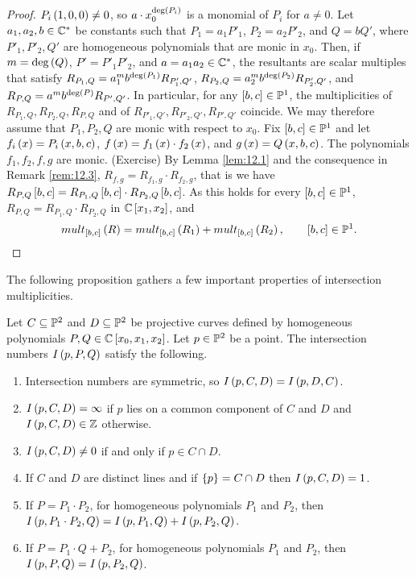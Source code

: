 \begin{proof}
$ P_i\br{1, 0, 0} \ne 0 $, so $ a \cdot x_0^{\deg\br{P_i}} $ is a monomial of $ P_i $ for $ a \ne 0 $. Let $ a_1, a_2, b \in \C^* $ be constants such that $ P_1 = a_1P'_1 $, $ P_2 = a_2P'_2 $, and $ Q = bQ' $, where $ P'_1, P'_2, Q' $ are homogeneous polynomials that are monic in $ x_0 $. Then, if $ m = \deg\br{Q} $, $ P' = P'_1P'_2 $, and $ a = a_1a_2 \in \C^* $, the resultants are scalar multiples that satisfy $ R_{P_1, Q} = a_1^mb^{\deg\br{P_1}}R_{P'_1, Q'} $, $ R_{P_2, Q} = a_2^mb^{\deg\br{P_2}}R_{P'_2, Q'} $, and $ R_{P, Q} = a^mb^{\deg\br{P}}R_{P', Q'} $. In particular, for any $ \sbr{b, c} \in \P^1 $, the multiplicities of $ R_{P_1, Q}, R_{P_2, Q}, R_{P, Q} $ and of $ R_{P'_1, Q'}, R_{P'_2, Q'}, R_{P', Q'} $ coincide. We may therefore assume that $ P_1, P_2, Q $ are monic with respect to $ x_0 $. Fix $ \sbr{b, c} \in \P^1 $ and let $ f_i\br{x} = P_i\br{x, b, c} $, $ f\br{x} = f_1\br{x} \cdot f_2\br{x} $, and $ g\br{x} = Q\br{x, b, c} $. The polynomials $ f_1, f_2, f, g $ are monic. (Exercise) By Lemma \ref{lem:12.1} and the consequence in Remark \ref{rem:12.3}, $ R_{f, g} = R_{f_1, g} \cdot R_{f_2, g} $, that is we have $ R_{P, Q}\sbr{b, c} = R_{P_1, Q}\sbr{b, c} \cdot R_{P_2, Q}\sbr{b, c} $. As this holds for every $ \sbr{b, c} \in \P^1 $, $ R_{P, Q} = R_{P_1, Q} \cdot R_{P_2, Q} $ in $ \C\sbr{x_1, x_2} $, and
$$ mult_{\sbr{b, c}}\br{R} = mult_{\sbr{b, c}}\br{R_1} + mult_{\sbr{b, c}}\br{R_2}, \qquad \sbr{b, c} \in \P^1. $$
\end{proof}

\pagebreak

The following proposition gathers a few important properties of intersection multiplicities.

\begin{proposition}
\label{prop:12.5}
Let $ C \subseteq \P^2 $ and $ D \subseteq \P^2 $ be projective curves defined by homogeneous polynomials $ P, Q \in \C\sbr{x_0, x_1, x_2} $. Let $ p \in \P^2 $ be a point. The intersection numbers $ I\br{p, P, Q} $ satisfy the following.
\begin{enumerate}
\item Intersection numbers are symmetric, so $ I\br{p, C, D} = I\br{p, D, C} $.
\item $ I\br{p, C, D} = \infty $ if $ p $ lies on a common component of $ C $ and $ D $ and $ I\br{p, C, D} \in \Z $ otherwise.
\item $ I\br{p, C, D} \ne 0 $ if and only if $ p \in C \cap D $.
\item If $ C $ and $ D $ are distinct lines and if $ \cbr{p} = C \cap D $ then $ I\br{p, C, D} = 1 $.
\item If $ P = P_1 \cdot P_2 $, for homogeneous polynomials $ P_1 $ and $ P_2 $, then $ I\br{p, P_1 \cdot P_2, Q} = I\br{p, P_1, Q} + I\br{p, P_2, Q} $.
\item If $ P = P_1 \cdot Q + P_2 $, for homogeneous polynomials $ P_1 $ and $ P_2 $, then $ I\br{p, P, Q} = I\br{p, P_2, Q} $.
\end{enumerate}
\end{proposition}

